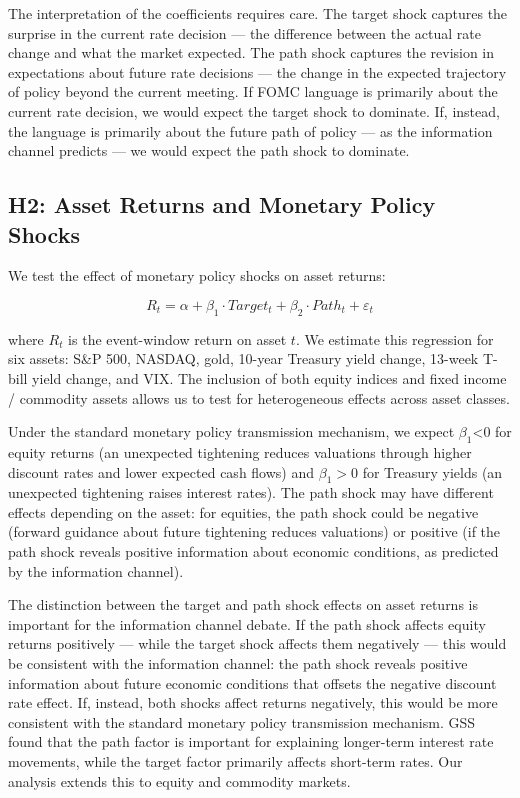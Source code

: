 \documentclass[12pt]{article}
\begin{document}
The interpretation of the coefficients requires care. The target shock captures the surprise in the current rate decision --- the difference between the actual rate change and what the market expected. The path shock captures the revision in expectations about future rate decisions --- the change in the expected trajectory of policy beyond the current meeting. If FOMC language is primarily about the current rate decision, we would expect the target shock to dominate. If, instead, the language is primarily about the future path of policy --- as the information channel predicts --- we would expect the path shock to dominate.

\subsection{H2: Asset Returns and Monetary Policy Shocks}

We test the effect of monetary policy shocks on asset returns:

\begin{equation*}
R_t = \alpha + \beta_1 \cdot Target_t + \beta_2 \cdot Path_t + \varepsilon_t
\end{equation*}

where $R_t$ is the event-window return on asset $t$. We estimate this regression for six assets: S\&P 500, NASDAQ, gold, 10-year Treasury yield change, 13-week T-bill yield change, and VIX. The inclusion of both equity indices and fixed income / commodity assets allows us to test for heterogeneous effects across asset classes.

Under the standard monetary policy transmission mechanism, we expect $\beta_1 $<$ 0$ for equity returns (an unexpected tightening reduces valuations through higher discount rates and lower expected cash flows) and $\beta_1 > 0$ for Treasury yields (an unexpected tightening raises interest rates). The path shock may have different effects depending on the asset: for equities, the path shock could be negative (forward guidance about future tightening reduces valuations) or positive (if the path shock reveals positive information about economic conditions, as predicted by the information channel).

The distinction between the target and path shock effects on asset returns is important for the information channel debate. If the path shock affects equity returns positively --- while the target shock affects them negatively --- this would be consistent with the information channel: the path shock reveals positive information about future economic conditions that offsets the negative discount rate effect. If, instead, both shocks affect returns negatively, this would be more consistent with the standard monetary policy transmission mechanism. GSS found that the path factor is important for explaining longer-term interest rate movements, while the target factor primarily affects short-term rates. Our analysis extends this to equity and commodity markets.
\end{document}
